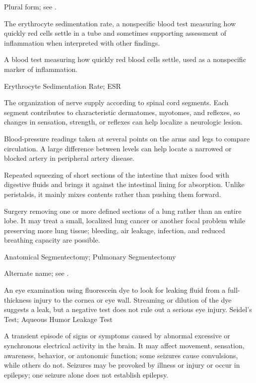  Plural form; see .

 The erythrocyte sedimentation rate, a nonspecific blood test measuring how quickly red cells settle in a tube and sometimes supporting assessment of inflammation when interpreted with other findings.

 A blood test measuring how quickly red blood cells settle, used as a nonspecific marker of inflammation.

\synonyms
Erythrocyte Sedimentation Rate; ESR

 The organization of nerve supply according to spinal cord segments. Each segment contributes to characteristic dermatomes, myotomes, and reflexes, so changes in sensation, strength, or reflexes can help localize a neurologic lesion.

 Blood-pressure readings taken at several points on the arms and legs to compare circulation. A large difference between levels can help locate a narrowed or blocked artery in peripheral artery disease.

 Repeated squeezing of short sections of the intestine that mixes food with digestive fluids and brings it against the intestinal lining for absorption. Unlike peristalsis, it mainly mixes contents rather than pushing them forward.

 Surgery removing one or more defined sections of a lung rather than an entire lobe. It may treat a small, localized lung cancer or another focal problem while preserving more lung tissue; bleeding, air leakage, infection, and reduced breathing capacity are possible.

\synonyms
Anatomical Segmentectomy; Pulmonary Segmentectomy

 Alternate name; see .

 An eye examination using fluorescein dye to look for leaking fluid from a full-thickness injury to the cornea or eye wall. Streaming or dilution of the dye suggests a leak, but a negative test does not rule out a serious eye injury.
\synonyms
Seidel's Test; Aqueous Humor Leakage Test

 A transient episode of signs or symptoms caused by abnormal excessive or synchronous electrical activity in the brain. It may affect movement, sensation, awareness, behavior, or autonomic function; some seizures cause convulsions, while others do not. Seizures may be provoked by illness or injury or occur in epilepsy; one seizure alone does not establish epilepsy.

